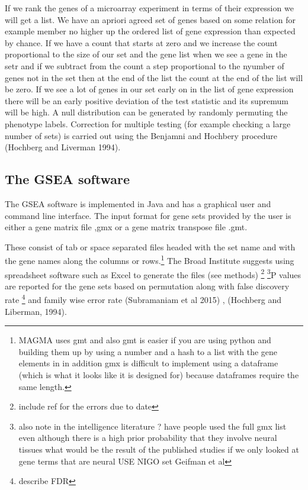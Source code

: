 If we rank the genes of a microarray experiment in terms of their expression we will get a list. We have an apriori agreed set of genes based on some relation for example member no higher up the ordered list of gene expression than expected by chance. If we have a count that starts at zero and we increase the count proportional to the size of our set and the gene list when we see a gene in the setr and if we subtract from the count a step proportional to the nyumber of genes not in the set then at the end of the list the count at the end of the list will be zero. If we see a lot of genes in our set early on in the list of gene expression there will be an early positive deviation of the test statistic and its supremum will be high. A null distribution can be generated by randomly permuting the phenotype labels. Correction for multiple testing (for example checking a large number of sets) is carried out using the Benjamni and Hochbery procedure (Hochberg and Liverman 1994).

\subsection{The GSEA software}

The GSEA software is implemented in Java and has a graphical user and command line interface. The input format for gene sets provided by the user is either a gene matrix file ,gmx or a gene matrix transpose file .gmt.

These consist of tab or space separated files headed with the set name and with the gene names along the columns or rows.\footnote{MAGMA uses gmt and also gmt is easier if you are using python and building them up by using a number and a hash to a list with the gene elements in in addition gmx is difficult to implement using a dataframe (which is what it looks like it is designed for) because dataframes require the same length.} The Broad Institute suggests using spreadsheet software such as Excel to generate the files (see methods) \footnote{include ref for the errors due to date} \footnote{also note in the intelligence literature ? have people used the full gmx list even although there is a high prior probability that they involve neural tissues what would be the result of the published studies if we only looked at gene terms that are neural USE NIGO set   Geifman et al}P values are reported for the gene sets based on permutation along with false discovery rate \cite{benjamini1995controlling}\footnote{describe FDR} and family wise error rate (Subramaniam et al 2015) , (Hochberg and Liberman, 1994).

